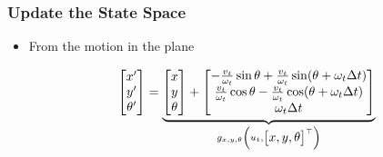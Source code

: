 \begin{frame}
    \frametitle{Update the State Space}

    \begin{itemize}
        \item From the motion in the plane
        
        \begin{equation*}
            \begin{bmatrix} x' \\ y' \\ \theta' \end{bmatrix} = 
            \underbrace{\begin{bmatrix} x \\ y \\ \theta \end{bmatrix} + 
            \begin{bmatrix} 
            -\frac{v_t}{\omega_t} \sin \theta + \frac{v_t}{\omega_t} \sin (\theta + \omega_t \Delta t) \\ 
            \frac{v_t}{\omega_t} \cos \theta - \frac{v_t}{\omega_t} \cos (\theta + \omega_t \Delta t) \\ 
            \omega_t \Delta t 
            \end{bmatrix}}_{g_{x,y,\theta}\left(u_{t}, \begin{bmatrix} x, y, \theta \end{bmatrix}^{\top}\right)}
        \end{equation*}
    


\end{itemize}
\end{frame}
